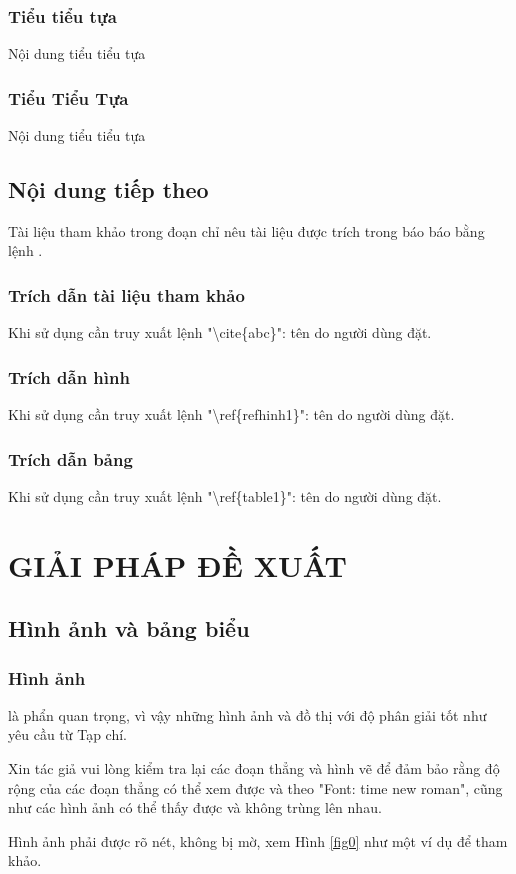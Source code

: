 \documentclass[a4paper,journal,11pt]{IEEEtran}
\begin{document}
	\subsubsection{Tiểu tiểu tựa}
		Nội dung tiểu tiểu tựa
	\subsubsection{Tiểu Tiểu Tựa}
		Nội dung tiểu tiểu tựa
\subsection{Nội dung tiếp theo}
	Tài liệu tham khảo trong đoạn chỉ nêu tài liệu được trích trong báo báo bằng lệnh \cite{tinh}.
	\subsubsection{Trích dẫn tài liệu tham khảo}
	Khi sử dụng cần truy xuất lệnh "\textbackslash cite\{abc\}": tên do người dùng đặt.
	\subsubsection{Trích dẫn hình}
	Khi sử dụng cần truy xuất lệnh "\textbackslash ref\{refhinh1\}": tên do người dùng đặt.
	\subsubsection{Trích dẫn bảng}
	Khi sử dụng cần truy xuất lệnh "\textbackslash ref\{table1\}": tên do người dùng đặt.
\section{GIẢI PHÁP ĐỀ XUẤT}
\subsection{Hình ảnh và bảng biểu}
\subsubsection{Hình ảnh} là phẩn quan trọng, vì vậy những hình ảnh và đồ thị với độ phân giải tốt như yêu cầu từ Tạp chí.

Xin tác giả vui lòng kiểm tra lại các đoạn thẳng và hình vẽ để đảm bảo rằng độ rộng của các đoạn thẳng có thể xem được và theo "Font: time new roman", cũng như các hình ảnh có thể thấy được và không trùng lên nhau. \cite{thuan}

Hình ảnh phải được rõ nét, không bị mờ, xem Hình \ref{fig0} như một ví dụ để tham khảo.
\end{document}
